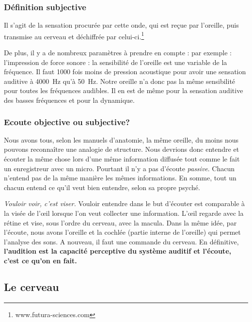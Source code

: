 \subsubsection{Définition subjective}	

	Il s'agit de la sensation procurée
	par cette onde, qui est reçue par l'oreille, puis transmise au cerveau
	et déchiffrée par celui-ci.\footnote{www.futura-sciences.com}

De plus, il y a de nombreux paramètres à prendre en compte : par
exemple : l'impression de force sonore : la sensibilité de l'oreille
est une variable de la fréquence. Il faut 1000 fois moins de pression
acoustique pour avoir une sensation auditive à \SI{4000}{\hertz} qu'à \SI{50}{\hertz}.
Notre oreille n'a donc pas la même sensibilité pour toutes
les fréquences audibles. Il en est de même pour la sensation auditive
des basses fréquences et pour la dynamique. 

\subsubsection{Ecoute objective ou subjective?}

Nous avons tous,
selon les manuels d'anatomie, la même
oreille, du moins nous pouvons reconnaître une analogie de structure. Nous devrions donc entendre et écouter la même chose
lors d'une même information diffusée tout comme le fait un enregistreur avec un micro. Pourtant il n'y a pas d'écoute \emph{passive}. Chacun n'entend pas de la même manière les mêmes
informations. En somme, tout un chacun entend ce qu'il veut bien
entendre, selon sa propre psyché. 

 \emph{Vouloir voir, c'est viser.}  Vouloir entendre dans le but d'écouter est comparable  à
la visée de l'\oe il lorsque l'on veut collecter une information. L'\oe il regarde avec la rétine et  vise, sous l'ordre du cerveau, avec la macula. Dans la même idée, par l'écoute, nous avons l'oreille et la cochlée (partie interne de l'oreille) qui permet l'analyse des sons. A nouveau, il faut une commande du cerveau.
En définitive, \textbf{ l'audition est la capacité perceptive du système auditif et l'écoute, c'est ce qu'on en fait.}

\subsection{Le cerveau}

